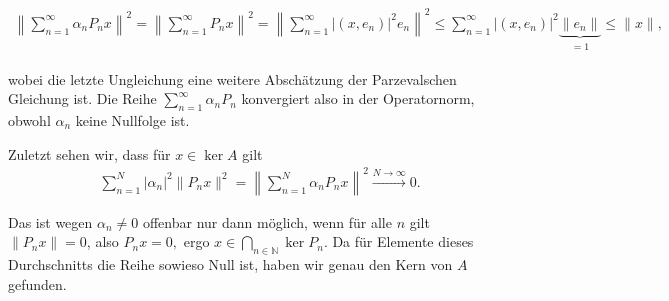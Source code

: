 \begin{solution}
  \begin{align}
      \left\| \sum_{n = 1}^{\infty} \alpha_n P_n x \right\|^2 =
      \left\| \sum_{n = 1}^{\infty} P_n x \right\|^2 = \left\| \sum_{n = 1}^{\infty} |(x, e_n)|^2 e_n \right\|^2 \leq \sum_{n = 1}^{\infty} |(x, e_n)|^2 \underbrace{\|e_n\|}_{\substack{= 1}} \leq \|x\|,
  \end{align}

  wobei die letzte Ungleichung eine weitere Abschätzung der Parzevalschen Gleichung ist. Die Reihe $\sum_{n = 1}^{\infty} \alpha_n P_n$ konvergiert also in der Operatornorm, obwohl $\alpha_n$ keine Nullfolge ist.

  Zuletzt sehen wir, dass für $x \in \ker A$ gilt
  \begin{align}
      \sum_{n=1}^N |\alpha_n|^2 \|P_n x\|^2 =
      \left\| \sum_{n = 1}^N \alpha_n P_n x \right\|^2 \stackrel{N \rightarrow \infty}{\longrightarrow} 0.
  \end{align}

  Das ist wegen $\alpha_n \neq 0$ offenbar nur dann möglich, wenn für alle $n$ gilt $\|P_n x\| = 0$, also $P_n x = 0,$ ergo $x \in \bigcap_{n \in \mathbb{N}} \ker P_n$. Da für Elemente dieses Durchschnitts die Reihe sowieso Null ist, haben wir genau den Kern von $A$ gefunden.
\end{solution}
